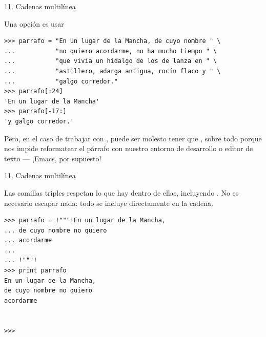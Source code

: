 \documentclass[14pt]{beamer}
\begin{document}
\begin{frame}[fragile]{11. Cadenas multilínea}

  \begin{block}{}
    \centering \large
    Una opción es usar 
  \end{block}

  \begin{exampleblock}{}
    \scriptsize
    \begin{lstlisting}
>>> parrafo = "En un lugar de la Mancha, de cuyo nombre " \
...           "no quiero acordarme, no ha mucho tiempo " \
...           "que vivía un hidalgo de los de lanza en " \
...           "astillero, adarga antigua, rocín flaco y " \
...           "galgo corredor."
>>> parrafo[:24]
'En un lugar de la Mancha'
>>> parrafo[-17:]
'y galgo corredor.'
    \end{lstlisting}
  \end{exampleblock}

  \begin{alertblock}{}
    \centering
    \small
    Pero, en el caso de trabajar con ,
    puede ser molesto tener que , sobre todo porque nos impide reformatear el
    párrafo con nuestro entorno de desarrollo o editor de texto ---
    ¡Emacs, por supuesto!
  \end{alertblock}
\end{frame}

\begin{frame}[fragile]{11. Cadenas multilínea}

  \begin{block}{}
    \centering
    Las comillas triples respetan  lo que hay dentro
    de ellas, incluyendo . No es necesario
    escapar nada: todo se incluye directamente en la cadena.
  \end{block}

  \begin{exampleblock}{}
    \scriptsize
    \begin{lstlisting}[escapechar=!]
>>> parrafo = !"""!En un lugar de la Mancha,
... de cuyo nombre no quiero
... acordarme
...
... !"""!
>>> print parrafo
En un lugar de la Mancha,
de cuyo nombre no quiero
acordarme


>>>
    \end{lstlisting}
  \end{exampleblock}
\end{frame}
\end{document}
